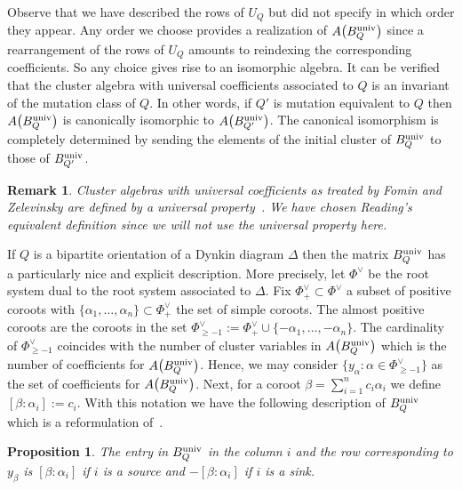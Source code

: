 \documentclass[pdftex]{sigma}%
\newtheorem{Proposition}[Theorem]{Proposition}
\newtheorem{Remark}[Theorem]{Remark}}
\numberwithin{equation}{section}
\begin{document}
Observe that we have described the rows of $U_Q$ but did not specify in which order they appear.
Any order we choose provides a realization of $A\big(B_Q^{{\rm univ}}\big)$ since a rearrangement of the rows of $U_Q$ amounts to reindexing the corresponding coefficients. So any choice gives rise to an isomorphic algebra.
It can be verified that the cluster algebra with universal coefficients associated to $Q$ is an invariant of the mutation class of $Q$. In other words, if $Q'$ is mutation equivalent to $Q$ then $A\big(B_Q^{{\rm univ}}\big)$ is canonically isomorphic to $A\big(B_{Q'}^{{\rm univ}}\big)$. The canonical isomorphism is completely determined by sending the elements of the initial cluster of $B_{Q}^{{\rm univ}}$ to those of $B_{Q'}^{{\rm univ}}$.

\begin{Remark}
Cluster algebras with universal coefficients as treated by Fomin and Zelevinsky are defined by a universal property~\cite[Definition~12.1]{FZ_clustersIV}. We have chosen Reading's equivalent definition since we will not use the universal property here.
\end{Remark}

If $Q$ is a bipartite orientation of a Dynkin diagram $\Delta$ then the matrix $B^{\rm univ}_Q$ has a particularly nice and explicit description.
More precisely, let $\Phi^{\vee}$ be the root system dual to the root system associated to $\Delta$. Fix $\Phi^{\vee}_+\subset \Phi^{\vee}$ a subset of positive coroots with $\{ \alpha_1, \dots , \alpha_n \} \subset \Phi^{\vee}_+$ the set of simple coroots.
The almost positive coroots are the coroots in the set $\Phi^{\vee}_{\geq -1}:= \Phi^{\vee}_+ \cup \{ -\alpha_1, \dots , -\alpha_n \}$.
The cardinality of $\Phi^{\vee}_{\geq -1}$ coincides with the number of cluster variables in $A\big(B^{\rm univ}_{Q}\big)$ which is the number of coefficients for $A\big(B^{\rm univ}_{Q}\big)$.
Hence, we may consider $\big\{ y_{\alpha} \colon \alpha \in \Phi^{\vee}_{\geq -1} \big\} $ as the set of coefficients for $A\big(B^{\rm univ}_{Q}\big)$.
Next, for a coroot $\beta = \sum_{i=1}^n c_i \alpha_i$ we define $[\beta: \alpha_i]:=c_i$. With this notation we have the following description of $ B^{\rm univ}_Q $ which is a reformulation of~\cite[Theorem~12.4]{FZ_clustersIV}.


\begin{Proposition}
The entry in $B_Q^{\rm univ}$ in the column $i $ and the row corresponding to $y_{\beta} $ is $[\beta : \alpha_i]$ if $i$ is a source and $-[\beta : \alpha_i]$ if $i$ is a sink.
\end{Proposition}
\end{document}
